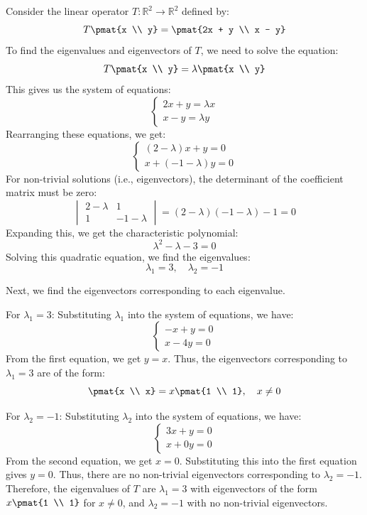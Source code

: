 \documentclass[openany]{book}
\begin{document}
\begin{example}
    Consider the linear operator $T: \mathbb{R}^2 \to \mathbb{R}^2$ defined by:
    $$T\pmat{x \\ y} = \pmat{2x + y \\ x - y}$$
    To find the eigenvalues and eigenvectors of $T$, we need to solve the equation:
    $$T\pmat{x \\ y} = \lambda \pmat{x \\ y}$$
    This gives us the system of equations:
    \[
    \begin{cases}
    2x + y = \lambda x \\
    x - y = \lambda y
    \end{cases}
    \]
    Rearranging these equations, we get:
    \[
    \begin{cases}
    (2 - \lambda)x + y = 0 \\
    x + (-1 - \lambda)y = 0
    \end{cases}
    \]
    For non-trivial solutions (i.e., eigenvectors), the determinant of the coefficient matrix must be zero:
    \[
    \begin{vmatrix}
    2 - \lambda & 1 \\
    1 & -1 - \lambda
    \end{vmatrix} = (2 - \lambda)(-1 - \lambda) - 1 = 0
    \]
    Expanding this, we get the characteristic polynomial:
    $$\lambda^2 - \lambda - 3 = 0$$
    Solving this quadratic equation, we find the eigenvalues:
    $$\lambda_1 = 3, \quad \lambda_2 = -1$$
    
    Next, we find the eigenvectors corresponding to each eigenvalue.
    
    For $\lambda_1 = 3$:
    Substituting $\lambda_1$ into the system of equations, we have:
    \[
    \begin{cases}
    -x + y = 0 \\
    x - 4y = 0
    \end{cases}
    \]
    From the first equation, we get $y = x$. Thus, the eigenvectors corresponding to $\lambda_1 = 3$ are of the form:
    $$\pmat{x \\ x} = x\pmat{1 \\ 1}, \quad x \neq 0$$
    
    For $\lambda_2 = -1$:
    Substituting $\lambda_2$ into the system of equations, we have:
    \[
    \begin{cases}
    3x + y = 0 \\
    x + 0y = 0
    \end{cases}
    \]
    From the second equation, we get $x = 0$. Substituting this into the first equation gives $y = 0$. Thus, there are no non-trivial eigenvectors corresponding to $\lambda_2 = -1$.
    Therefore, the eigenvalues of $T$ are $\lambda_1 = 3$ with eigenvectors of the form $x\pmat{1 \\ 1}$ for $x \neq 0$, and $\lambda_2 = -1$ with no non-trivial eigenvectors.
\end{example}
\end{document}
